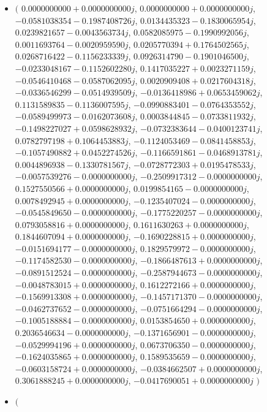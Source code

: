 \documentclass[14pt,a4paper]{article}
\begin{document}
\begin{itemize}
\item
$\big($
$0.0000000000+0.0000000000j$, $0.0000000000+0.0000000000j$, $-0.0581038354-0.1987408726j$, $0.0134435323-0.1830065954j$, $0.0239821657-0.0043563734j$, $0.0582085975-0.1990992056j$, $0.0011693764-0.0020959590j$, $0.0205770394+0.1764502565j$, $0.0268716422-0.1156233339j$, $0.0926314790-0.1901046500j$, $-0.0233048167-0.1152602280j$, $0.1417035227+0.0023271159j$, $-0.0546410468-0.0587062095j$, $0.0020909408+0.0217604318j$, $-0.0336546299-0.0514939509j$, $-0.0136418986+0.0653459062j$, $0.1131589835-0.1136007595j$, $-0.0990883401-0.0764353552j$, $-0.0589499973-0.0162073608j$, $0.0003844845-0.0733811932j$, $-0.1498227027+0.0598628932j$, $-0.0732383644-0.0400123741j$, $0.0782797198+0.1064453883j$, $-0.1124053469-0.0841458853j$, $-0.1057490882+0.0452274526j$, $-0.1166591861-0.0468913781j$, $0.0044896938-0.1330781567j$, $-0.0728772303+0.0195478533j$, $-0.0057539276-0.0000000000j$, $-0.2509917312-0.0000000000j$, $0.1527550566+0.0000000000j$, $0.0199854165-0.0000000000j$, $0.0078492945+0.0000000000j$, $-0.1235407024-0.0000000000j$, $-0.0545849650-0.0000000000j$, $-0.1775220257-0.0000000000j$, $0.0793058816+0.0000000000j$, $0.1611630263+0.0000000000j$, $0.1844607094+0.0000000000j$, $-0.1690228815+0.0000000000j$, $-0.0151694177-0.0000000000j$, $0.1829579972-0.0000000000j$, $-0.1174582530-0.0000000000j$, $-0.1866487613+0.0000000000j$, $-0.0891512524-0.0000000000j$, $-0.2587944673-0.0000000000j$, $-0.0048783015+0.0000000000j$, $0.1612272166+0.0000000000j$, $-0.1569913308+0.0000000000j$, $-0.1457171370-0.0000000000j$, $-0.0462737652-0.0000000000j$, $-0.0751664294-0.0000000000j$, $-0.1005188884-0.0000000000j$, $0.0153854650+0.0000000000j$, $0.2036546634-0.0000000000j$, $-0.1371656901-0.0000000000j$, $-0.0529994196+0.0000000000j$, $0.0673706350-0.0000000000j$, $-0.1624035865+0.0000000000j$, $0.1589535659-0.0000000000j$, $-0.0603158724+0.0000000000j$, $-0.0384662507+0.0000000000j$, $0.3061888245+0.0000000000j$, $-0.0417690051+0.0000000000j$
$\big)$
\item
$\big($

\end{itemize}
\end{document}
